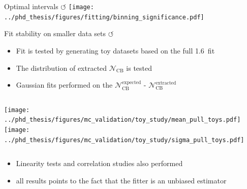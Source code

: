 \documentclass[xcolor=dvipsnames]{beamer}
\begin{document}
\begin{frame}{Optimal \EB intervals \hyperlink{frame:A}{$\circlearrowleft$}}
   \centering
   \texttt{[image: ../phd\_thesis/figures/fitting/binning\_significance.pdf]}
   
\end{frame}

\begin{frame}{Fit stability on smaller data sets \hyperlink{frame:A}{$\circlearrowleft$}}
   \scriptsize\centering
      \begin{itemize}
         \item Fit is tested by generating toy datasets based on the full 1.6~\invab fit
         \item The distribution of extracted $\mathcal{N}_{\mathrm{CB}}$ is tested
         \item Gaussian fits performed on the $\mathcal{N}_{\mathrm{CB}}^{\mathrm{expected}}$ - $\mathcal{N}_{\mathrm{CB}}^{\mathrm{extracted}}$
      \end{itemize}
   
   \begin{columns}
      \texttt{[image: ../phd\_thesis/figures/mc\_validation/toy\_study/mean\_pull\_toys.pdf]}
      \texttt{[image: ../phd\_thesis/figures/mc\_validation/toy\_study/sigma\_pull\_toys.pdf]}
   \end{columns}
   
   \begin{itemize}
      \item Linearity tests and correlation studies also performed
      \item[\ra] all results points to the fact that the fitter is an unbiased estimator
   \end{itemize}
   
   
   
   
   
   \end{frame}
\end{document}

